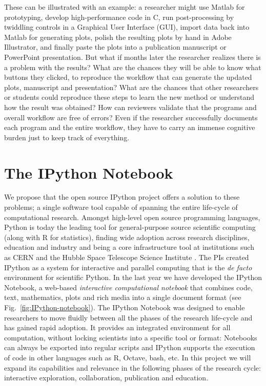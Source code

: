 \documentclass[12pt]{article}
\begin{document}
These can be illustrated with an example: a researcher might use Matlab
for prototyping, develop high-performance code in C, run post-processing
by twiddling controls in a Graphical User Interface (GUI), import
data back into Matlab for generating plots, polish the resulting plots
by hand in Adobe Illustrator, and finally paste the plots into a publication
manuscript or PowerPoint presentation. But what if months later the
researcher realizes there is a problem with the results? What are
the chances they will be able to know what buttons they clicked, to
reproduce the workflow that can generate the updated plots, manuscript
and presentation? What are the chances that other researchers or students
could reproduce these steps to learn the new method or understand
how the result was obtained? How can reviewers validate that the programs
and overall workflow are free of errors? Even if the researcher successfully
documents each program and the entire workflow, they have to carry
an immense cognitive burden just to keep track of everything.

\section{The IPython Notebook}

We propose that the open source IPython project \cite{PER-GRA:2007}
offers a solution to these problems; a single software tool capable
of spanning the entire life-cycle of computational research. Amongst
high-level open source programming languages, Python is today the
leading tool for general-purpose source scientific computing (along
with R for statistics), finding wide adoption across research disciplines,
education and industry and being a core infrastructure tool at institutions
such as CERN and the Hubble Space Telescope Science Institute \cite{Perez2011,ganga09,SST}.
The PIs created IPython as a system for interactive and parallel computing
that is the\emph{ de facto} environment for scientific Python. In
the last year we have developed the IPython Notebook, a web-based\emph{
interactive computational notebook} that combines code, text, mathematics,
plots and rich media into a single document format (see Fig.~\ref{fig:IPython-notebook}).
The IPython Notebook was designed to enable researchers to move fluidly
between all the phases of the research life-cycle and has gained rapid
adoption. It provides an integrated environment for all computation,
without locking scientists into a specific tool or format: Notebooks
can always be exported into regular scripts and IPython supports the
execution of code in other languages such as R, Octave, bash, etc.
In this project we will expand its capabilities and relevance in the
following phases of the research cycle: interactive exploration, collaboration,
publication and education.
\end{document}
